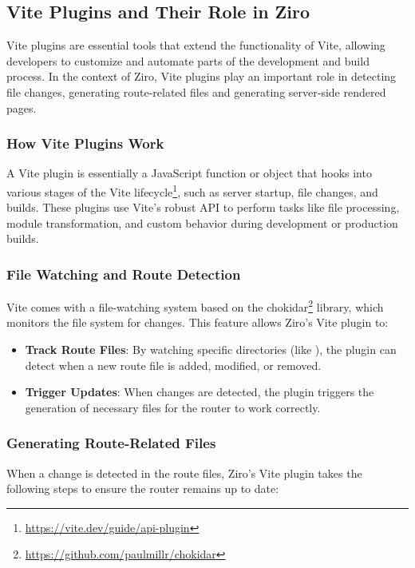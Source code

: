 \subsection{Vite Plugins and Their Role in Ziro}

Vite plugins are essential tools that extend the functionality of Vite, allowing developers to customize and automate parts of the development and build process. In the context of Ziro, Vite plugins play an important role in detecting file changes, generating route-related files and generating server-side rendered pages.

\subsubsection{How Vite Plugins Work}
A Vite plugin is essentially a JavaScript function or object that hooks into various stages of the Vite lifecycle\footnote{\url{https://vite.dev/guide/api-plugin}}, such as server startup, file changes, and builds. These plugins use Vite's robust API to perform tasks like file processing, module transformation, and custom behavior during development or production builds.

\subsubsection{File Watching and Route Detection}
Vite comes with a file-watching system based on the chokidar\footnote{\url{https://github.com/paulmillr/chokidar}} library, which monitors the file system for changes. This feature allows Ziro’s Vite plugin to:
\begin{itemize}
	\item \textbf{Track Route Files}: By watching specific directories (like ), the plugin can detect when a new route file is added, modified, or removed.
	\item \textbf{Trigger Updates}: When changes are detected, the plugin triggers the generation of necessary files for the router to work correctly.
\end{itemize}

\subsubsection{Generating Route-Related Files}
When a change is detected in the route files, Ziro’s Vite plugin takes the following steps to ensure the router remains up to date:

